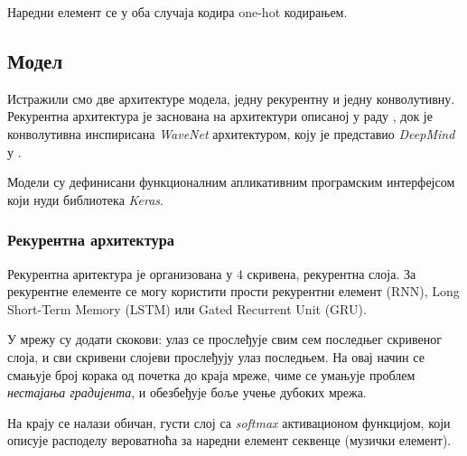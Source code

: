 \documentclass[11pt]{article}
\begin{document}
Наредни елемент се у оба случаја кодира one-hot кодирањем.

\subsection{Модел}
\label{sec:org94184e3}
Истражили смо две архитектуре модела, једну рекурентну и једну конволутивну. Рекурентна архитектура је заснована на архитектури описаној у раду \cite{graves_generating_2013}, док је конволутивна инспирисана \emph{WaveNet} архитектуром, коју је представио \emph{DeepMind} у \cite{van_der_oord_wavenet_2016}.

Модели су дефинисани функционалним апликативним програмским интерфејсом који нуди библиотека \emph{Keras}.

\subsubsection{Рекурентна архитектура}
\label{sec:orge6c52e7}
Рекурентна аритектура је организована у 4 скривена, рекурентна слоја. За рекурентне елементе се могу користити прости рекурентни елемент (RNN), Long Short-Term Memory (LSTM) или Gated Recurrent Unit (GRU).

У мрежу су додати скокови: улаз се прослеђује свим сем последњег скривеног слоја, и сви скривени слојеви прослеђују улаз последњем. На овај начин се смањује број корака од почетка до краја мреже, чиме се умањује проблем \emph{нестајања градијента}, и обезбеђује боље учење дубоких мрежа.

На крају се налази обичан, густи слој са \emph{softmax} активационом функцијом, који описује расподелу вероватноћа за наредни елемент секвенце (музички елемент).
\end{document}
